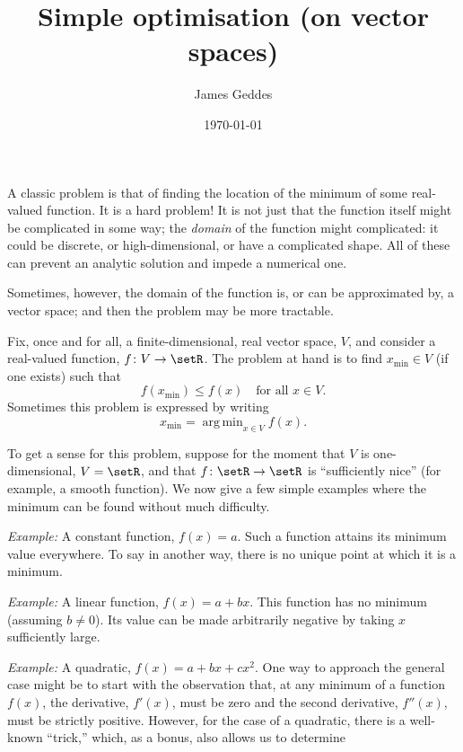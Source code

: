 \documentclass[10pt, a4paper]{article}
\title{Simple optimisation (on vector spaces)}
\author{James Geddes}
\date{\today}
\DeclareMathOperator*{\argmin}{arg\,min}
\newcommand{\eg}{\emph{Example:}}
\begin{document}
\maketitle

A classic problem is that of finding the location of the minimum of
some real-valued function. It is a hard problem! It is not just that
the function itself might be complicated in some way; the
\emph{domain} of the function might complicated: it could be discrete,
or high-dimensional, or have a complicated shape. All of these can
prevent an analytic solution and impede a numerical one.

Sometimes, however, the domain of the function is, or can be
approximated by, a vector space; and then the problem may be more
tractable.

Fix, once and for all, a finite-dimensional, real vector space, $V$,
and consider a real-valued function, $f\colon V\to \setR$. The problem
at hand is to find $x_\text{min}\in V$ (if one exists) such that
\begin{equation*}
 f(x_\text{min}) \leq f(x) \quad\text{for all $x\in V$}.  
\end{equation*}
Sometimes this problem is expressed by writing
\begin{equation*}
  x_\text{min} = \argmin_{x\in V} f(x).
\end{equation*}

To get a sense for this problem, suppose for the moment that $V$ is
one-dimensional, $V=\setR$, and that $f\colon \setR\to\setR$ is
“sufficiently nice” (for example, a smooth function). We now give a
few simple examples where the minimum can be found without much
difficulty.

\eg{} A constant function, $f(x) = a$. Such a function attains its
minimum value everywhere. To say in another way, there is no unique
point at which it is a minimum.

\eg{} A linear function, $f(x) = a + bx$. This
function has no minimum (assuming $b\neq0$). Its value can be made
arbitrarily negative by taking $x$ sufficiently large.

\eg{} A quadratic, $f(x) = a + bx + cx^2$. One way to approach the
general case might be to start with the observation that, at any
minimum of a function $f(x)$, the derivative, $f'(x)$, must be zero
and the second derivative, $f''(x)$, must be strictly
positive. However, for the case
of a quadratic, there is a well-known “trick,” which, as a bonus, also
allows us to determine
\end{document}
